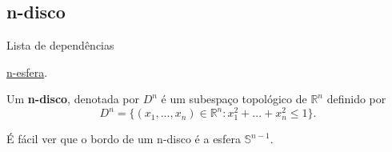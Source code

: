 \subsection{n-disco}
\label{n-disco-def}
\begin{titlemize}{Lista de dependências}
	\item \hyperref[n-esfera-def]{n-esfera}.
\end{titlemize}
\begin{defi}
     Um \textbf{n-disco}, denotada por $D^n$ é um subespaço topológico de $\mathbb{R}^{n}$ definido por 
     \[D^n=\{(x_1,...,x_n)\in \mathbb{R}^{n}:x_1^2+...+x_n^2\le 1\}.\]
\end{defi}
É fácil ver que o bordo de um n-disco é a esfera $\mathbb{S}^{n-1}$.
